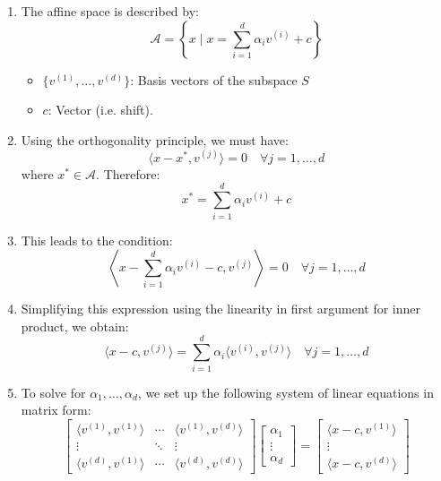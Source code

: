         \begin{derivation}
            \begin{enumerate}
                \item The affine space is described by:
                \[
                \mathcal{A} = \left\{ x \mid x = \sum_{i=1}^{d} \alpha_i v^{(i)} + c \right\}
                \]
                \begin{itemize}
                    \item $\{v^{(1)}, \dots, v^{(d)}\}$: Basis vectors of the subspace $S$
                    \item $c$: Vector (i.e. shift).
                \end{itemize}
            
                \item Using the orthogonality principle, we must have:
                \[
                \langle x - x^*, v^{(j)} \rangle = 0 \quad \forall j = 1, \dots, d
                \]
                where $x^* \in \mathcal{A}$. Therefore:
                \[
                x^* = \sum_{i=1}^{d} \alpha_i v^{(i)} + c
                \]
            
                \item This leads to the condition:
                \[
                \left\langle x - \sum_{i=1}^{d} \alpha_i v^{(i)} - c, v^{(j)} \right\rangle = 0 \quad \forall j = 1, \dots, d
                \]
            
                \item Simplifying this expression using the linearity in first argument for inner product, we obtain:
                \[
                \langle x - c, v^{(j)} \rangle = \sum_{i=1}^{d} \alpha_i \langle v^{(i)}, v^{(j)} \rangle \quad \forall j = 1, \dots, d
                \]
            
                \item To solve for $\alpha_1, \dots, \alpha_d$, we set up the following system of linear equations in matrix form:
                \[
                \begin{bmatrix}
                \langle v^{(1)}, v^{(1)} \rangle & \cdots & \langle v^{(1)}, v^{(d)} \rangle \\
                \vdots & \ddots & \vdots \\
                \langle v^{(d)}, v^{(1)} \rangle & \cdots & \langle v^{(d)}, v^{(d)} \rangle
                \end{bmatrix}
                \begin{bmatrix}
                \alpha_1 \\
                \vdots \\
                \alpha_d
                \end{bmatrix}
                =
                \begin{bmatrix}
                \langle x - c, v^{(1)} \rangle \\
                \vdots \\
                \langle x - c, v^{(d)} \rangle
                \end{bmatrix}
                \]
            

\end{enumerate}
\end{derivation}
